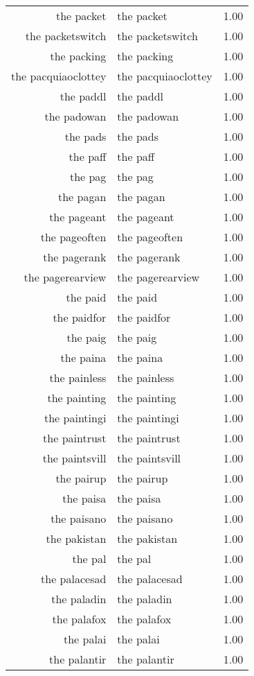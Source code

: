 \begin{table}[ht]
\begin{tabular}{rlr}
  the packet & the packet & 1.00 \\ 
  the packetswitch & the packetswitch & 1.00 \\ 
  the packing & the packing & 1.00 \\ 
  the pacquiaoclottey & the pacquiaoclottey & 1.00 \\ 
  the paddl & the paddl & 1.00 \\ 
  the padowan & the padowan & 1.00 \\ 
  the pads & the pads & 1.00 \\ 
  the paff & the paff & 1.00 \\ 
  the pag & the pag & 1.00 \\ 
  the pagan & the pagan & 1.00 \\ 
  the pageant & the pageant & 1.00 \\ 
  the pageoften & the pageoften & 1.00 \\ 
  the pagerank & the pagerank & 1.00 \\ 
  the pagerearview & the pagerearview & 1.00 \\ 
  the paid & the paid & 1.00 \\ 
  the paidfor & the paidfor & 1.00 \\ 
  the paig & the paig & 1.00 \\ 
  the paina & the paina & 1.00 \\ 
  the painless & the painless & 1.00 \\ 
  the painting & the painting & 1.00 \\ 
  the paintingi & the paintingi & 1.00 \\ 
  the paintrust & the paintrust & 1.00 \\ 
  the paintsvill & the paintsvill & 1.00 \\ 
  the pairup & the pairup & 1.00 \\ 
  the paisa & the paisa & 1.00 \\ 
  the paisano & the paisano & 1.00 \\ 
  the pakistan & the pakistan & 1.00 \\ 
  the pal & the pal & 1.00 \\ 
  the palacesad & the palacesad & 1.00 \\ 
  the paladin & the paladin & 1.00 \\ 
  the palafox & the palafox & 1.00 \\ 
  the palai & the palai & 1.00 \\ 
  the palantir & the palantir & 1.00 \\ 

\end{tabular}
\end{table}
